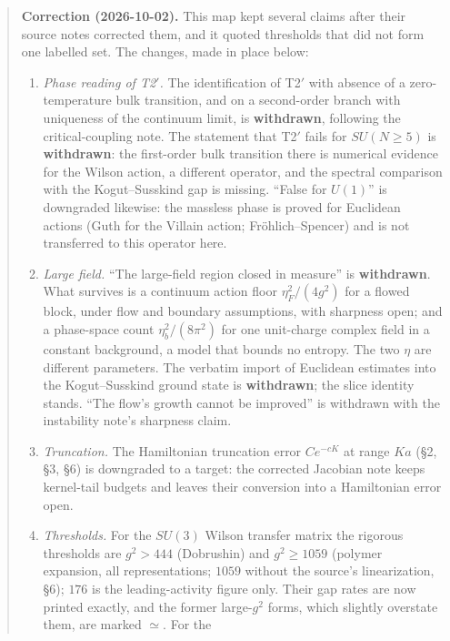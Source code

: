 \documentclass[11pt,a4paper]{article}
\newcommand{\tightlist}{\setlength{\itemsep}{0pt}\setlength{\parskip}{0pt}}
\begin{document}
\begin{quote}
\textbf{Correction (2026-10-02).} This map kept several claims after
their source notes corrected them, and it quoted thresholds that did not
form one labelled set. The changes, made in place below:

\begin{enumerate}
\def\labelenumi{\arabic{enumi}.}
\tightlist
\item
  \emph{Phase reading of T2\('\).} The identification of T2\('\) with
  absence of a zero-temperature bulk transition, and on a second-order
  branch with uniqueness of the continuum limit, is \textbf{withdrawn},
  following the critical-coupling note. The statement that T2\('\) fails
  for \(SU(N\ge5)\) is \textbf{withdrawn}: the first-order bulk
  transition there is numerical evidence for the Wilson action, a
  different operator, and the spectral comparison with the
  Kogut--Susskind gap is missing. ``False for \(U(1)\)'' is downgraded
  likewise: the massless phase is proved for Euclidean actions (Guth for
  the Villain action; Fröhlich--Spencer) and is not transferred to this
  operator here.
\item
  \emph{Large field.} ``The large-field region closed in measure'' is
  \textbf{withdrawn}. What survives is a continuum action floor
  \(\eta_F^2/(4g^2)\) for a flowed block, under flow and boundary
  assumptions, with sharpness open; and a phase-space count
  \(\eta_b^2/(8\pi^2)\) for one unit-charge complex field in a constant
  background, a model that bounds no entropy. The two \(\eta\) are
  different parameters. The verbatim import of Euclidean estimates into
  the Kogut--Susskind ground state is \textbf{withdrawn}; the slice
  identity stands. ``The flow's growth cannot be improved'' is withdrawn
  with the instability note's sharpness claim.
\item
  \emph{Truncation.} The Hamiltonian truncation error \(Ce^{-cK}\) at
  range \(Ka\) (§2, §3, §6) is downgraded to a target: the corrected
  Jacobian note keeps kernel-tail budgets and leaves their conversion
  into a Hamiltonian error open.
\item
  \emph{Thresholds.} For the \(SU(3)\) Wilson transfer matrix the
  rigorous thresholds are \(g^2>444\) (Dobrushin) and \(g^2\ge1059\)
  (polymer expansion, all representations; \(1059\) without the source's
  linearization, §6); \(176\) is the leading-activity figure only. Their
  gap rates are now printed exactly, and the former large-\(g^2\) forms,
  which slightly overstate them, are marked \(\simeq\). For the

\end{enumerate}
\end{quote}
\end{document}
